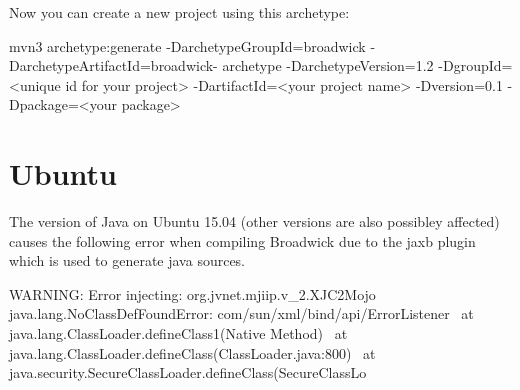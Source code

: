 Now you can create a new project using this archetype:
\begin{sourcecode}
mvn3 archetype:generate -DarchetypeGroupId=broadwick -DarchetypeArtifactId=broadwick- archetype -DarchetypeVersion=1.2 -DgroupId=<unique id for your project> -DartifactId=<your project name> -Dversion=0.1 -Dpackage=<your package> 
\end{sourcecode}




\section{Ubuntu}

The version of Java on Ubuntu 15.04 (other versions are also possibley affected) causes the following error when compiling Broadwick due to the jaxb plugin which is used to generate java sources.

\begin{sourcecode}
WARNING: Error injecting: org.jvnet.mjiip.v\_2.XJC2Mojo
java.lang.NoClassDefFoundError: com/sun/xml/bind/api/ErrorListener \
	at java.lang.ClassLoader.defineClass1(Native Method)  \
	at java.lang.ClassLoader.defineClass(ClassLoader.java:800) \
	at java.security.SecureClassLoader.defineClass(SecureClassLo
\end{sourcecode}

